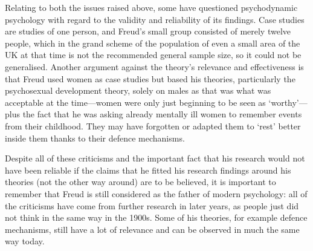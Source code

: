 \documentclass[a4paper]{article}
\begin{document}
Relating to both the issues raised above, some have questioned psychodynamic psychology with regard to the validity and reliability of its findings. Case studies are studies of one person, and Freud's small group consisted of merely twelve people, which in the grand scheme of the population of even a small area of the UK at that time is not the recommended general sample size, so it could not be generalised. Another argument against the theory's relevance and effectiveness is that Freud used women as case studies but based his theories, particularly the psychosexual development theory, solely on males as that was what was acceptable at the time---women were only just beginning to be seen as `worthy'---plus the fact that he was asking already mentally ill women to remember events from their childhood. They may have forgotten or adapted them to `rest' better inside them thanks to their defence mechanisms.

Despite all of these criticisms and the important fact that his research would not have been reliable if the claims that he fitted his research findings around his theories (not the other way around) are to be believed, it is important to remember that Freud is still considered as the father of modern psychology: all of the criticisms have come from further research in later years, as people just did not think in the same way in the 1900s. Some of his theories, for example defence mechanisms, still have a lot of relevance and can be observed in much the same way today.
\end{document}
